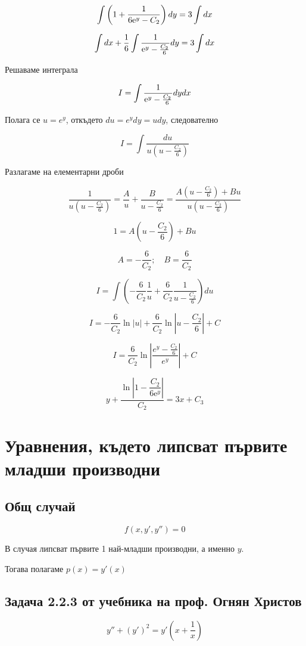 \documentclass{scrartcl}
\begin{document}
$$\displaystyle \int \left(1+\dfrac{1}{6\mathrm{e}^y-C_2}\right)\space dy = 3\int dx$$

$$\displaystyle \int dx + \dfrac{1}{6}\int \dfrac{1}{\mathrm{e}^y-\frac{C_2}{6}}\space dy = 3\int dx$$

Решаваме интеграла

$$I = \displaystyle \int \dfrac{1}{\mathrm{e}^y-\frac{C_2}{6}}\space dy \space dx$$

Полага се \( u = e^y \), откъдето \( du = e^y dy = u dy \), следователно

$$I = \int \frac{du}{u(u - \frac{C_2}{6})}$$

Разлагаме на елементарни дроби

$$\frac{1}{u(u - \frac{C_2}{6})} = \frac{A}{u} + \frac{B}{u - \frac{C_2}{6}} = \frac{A (u - \frac{C_2}{6}) + B u}{u(u - \frac{C_2}{6})}$$

$$1 = A (u - \frac{C_2}{6}) + B u$$

$$A = -\dfrac{6}{C_2};\quad B=\dfrac{6}{C_2}$$

$$I = \int \left( -\frac{6}{C_2} \frac{1}{u} + \frac{6}{C_2} \frac{1}{u - \frac{C_2}{6}} \right) du$$

$$I = -\frac{6}{C_2} \ln |u| + \frac{6}{C_2} \ln \left| u - \frac{C_2}{6} \right| + C$$

$$I = \frac{6}{C_2} \ln \left| \frac{e^y - \frac{C_2}{6}}{e^y} \right| + C$$

$$y + \dfrac{\ln{\left|1-\dfrac{C_2}{6\mathrm{e}^y}\right|}}{C_2} = 3x+C_3$$

\section{Уравнения, където липсват първите младши производни}

\subsection{Общ случай}

$$f(x, y', y'') = 0$$

В случая липсват първите 1 най-младши производни, а именно $y$.

Тогава полагаме $p(x) = y'(x)$

\subsection{Задача 2.2.3 от учебника на проф. Огнян Христов}

$$y'' + (y')^2 = y'\left(x+\dfrac{1}{x}\right)$$
\end{document}
